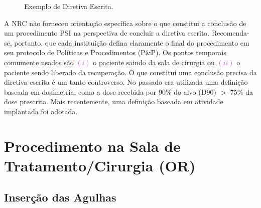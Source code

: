 \documentclass[11pt,a4paper]{article}
\begin{document}
	\begin{figure}[h]
		\centering
		\caption{Exemplo de Diretiva Escrita.}
		\label{fig:prescricaoErscrita}
	\end{figure}

	A NRC não forneceu orientação específica sobre o que constitui a conclusão de um procedimento PSI na perspectiva de concluir a diretiva escrita. Recomenda-se, portanto, que cada instituição defina claramente o final do procedimento em seu protocolo de Políticas e Procedimentos (P\&P). Os pontos temporais comumente usados são \textcolor{MediumOrchid}{$(i)$} o paciente saindo da sala de cirurgia ou \textcolor{MediumOrchid}{$(ii)$} o paciente sendo liberado da recuperação. O que constitui uma conclusão precisa da diretiva escrita é um tanto controverso. No passado era utilizada uma definição baseada em dosimetria, como a dose recebida por 90\% do alvo (D90) $>$ 75\% da dose prescrita. Mais recentemente, uma definição baseada em atividade implantada foi adotada.
	
\section{Procedimento na Sala de Tratamento/Cirurgia (OR)}

\subsection*{Inserção das Agulhas}
\end{document}

